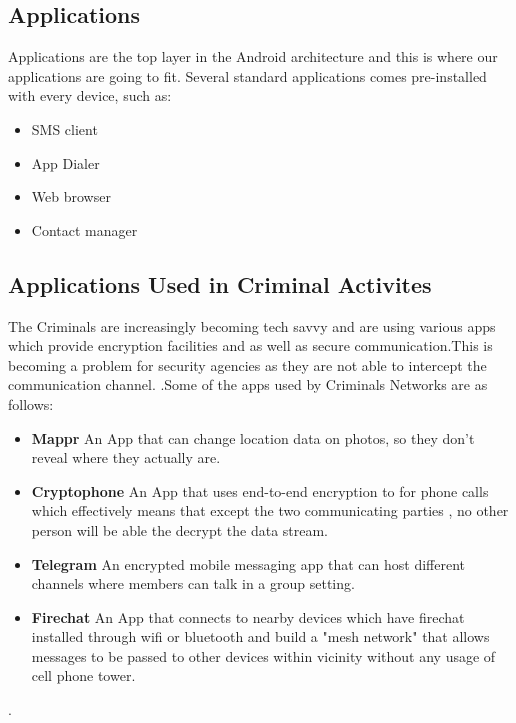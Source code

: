 \subsection{Applications}

Applications are the top layer in the Android architecture and this is where our applications are going to fit. Several standard applications comes pre-installed with every device, such as: 

\begin{itemize}

\item SMS client 

\item App Dialer

\item Web browser

\item Contact manager
\end{itemize}

\subsection{Applications Used in Criminal Activites}
The Criminals are increasingly becoming tech savvy and are using various apps which provide encryption facilities and as well as secure communication.This is becoming a problem for security agencies as they are not able to intercept the communication channel. .Some of the apps used by Criminals Networks are as follows:

\begin{itemize}
\item \textbf{Mappr} An App that can change location data on photos, so they don't reveal where they actually are.
\item \textbf{Cryptophone }An App that uses end-to-end encryption to for phone calls which effectively means that except the two communicating parties , no other person will be able the decrypt the data stream.
\item \textbf{Telegram} An  encrypted mobile messaging app that can host different channels where  members can talk in a group setting.
\item \textbf{Firechat} An App that connects to nearby devices which have firechat installed through wifi or bluetooth and build a "mesh network" that allows messages to be passed to other devices within vicinity without any usage of cell phone tower.
\end{itemize}








 .







